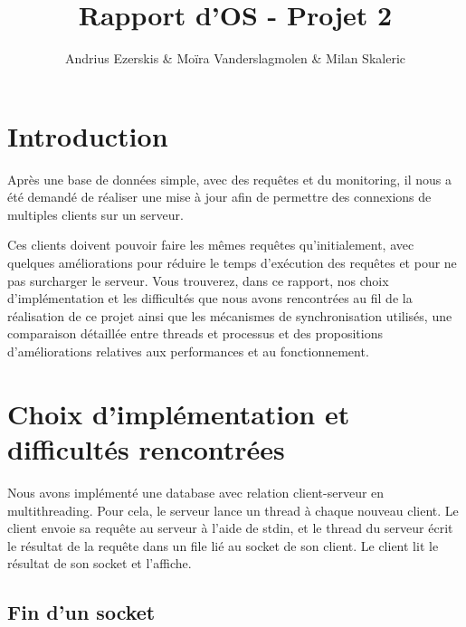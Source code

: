 \documentclass[utf8]{article}
\begin{document}
\begin{titlepage}


\author{Andrius Ezerskis \& Moïra Vanderslagmolen \& Milan Skaleric}
\title{Rapport d'OS - Projet 2}

\maketitle
\end{titlepage}
\begin{large}

\section{Introduction}
\par
\indent

Après une base de données simple, avec des requêtes et du monitoring, il nous a
été demandé de réaliser une mise à jour afin de permettre des connexions de
multiples clients sur un serveur.

\par
\par

Ces clients doivent pouvoir faire les mêmes requêtes qu'initialement, avec
quelques améliorations pour réduire le temps d'exécution des requêtes et pour ne
pas surcharger le serveur. Vous trouverez, dans ce rapport, nos choix
d'implémentation et les difficultés que nous avons rencontrées au fil de la
réalisation de ce projet ainsi que les mécanismes de synchronisation utilisés,
une comparaison détaillée entre threads et processus et des propositions
d'améliorations relatives aux performances et au fonctionnement.

\par
\section{Choix d'implémentation et difficultés rencontrées}
Nous avons implémenté une database avec relation client-serveur en
multithreading. Pour cela, le serveur lance un thread à chaque nouveau client.
Le client envoie sa requête au serveur à l'aide de stdin, et le thread du
serveur écrit le résultat de la requête dans un file lié au socket de son
client. Le client lit le résultat de son socket et l'affiche.
\subsection{Fin d'un socket}
\par
\indent


\end{large}
\end{document}

